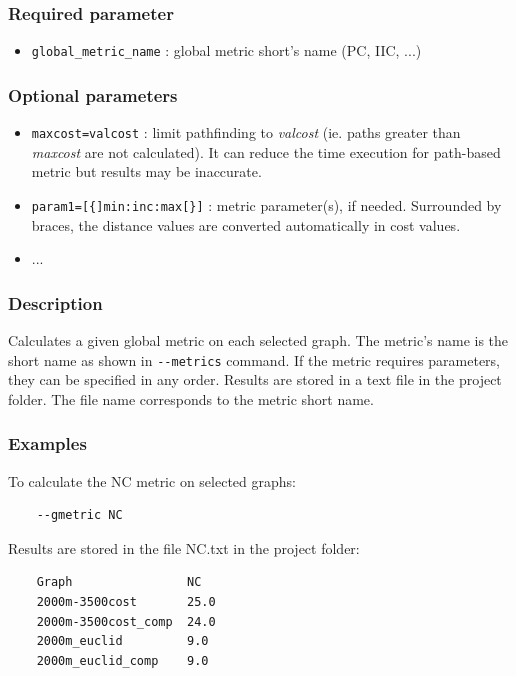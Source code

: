 \documentclass[a4paper,10pt]{report}
\begin{document}
\subsubsection{Required parameter}
\begin{itemize}
	\item \verb|global_metric_name| : global metric short's name (PC, IIC, ...)
\end{itemize}

\subsubsection{Optional parameters}
\begin{itemize}
	\item \verb|maxcost=valcost| : limit pathfinding to \textit{valcost} (ie. paths greater than \textit{maxcost} are not calculated). It can reduce the time execution for path-based metric but results may be inaccurate.
	\item \verb|param1=[{]min:inc:max[}]| : metric parameter(s), if needed. Surrounded by braces, the distance values are converted automatically in cost values.
	\item ...
\end{itemize}

\subsubsection{Description}
Calculates a given global metric on each selected graph. 
The metric's name is the short name as shown in \verb|--metrics| command.
If the metric requires parameters, they can be specified in any order.
Results are stored in a text file in the project folder. The file name corresponds to the metric short name.

\subsubsection{Examples}
To calculate the NC metric on selected graphs:
\begin{Verbatim}
	--gmetric NC
\end{Verbatim}
Results are stored in the file NC.txt in the project folder:
\begin{Verbatim}
	Graph                NC
	2000m-3500cost       25.0
	2000m-3500cost_comp  24.0
	2000m_euclid         9.0
	2000m_euclid_comp    9.0
\end{Verbatim}
\end{document}
